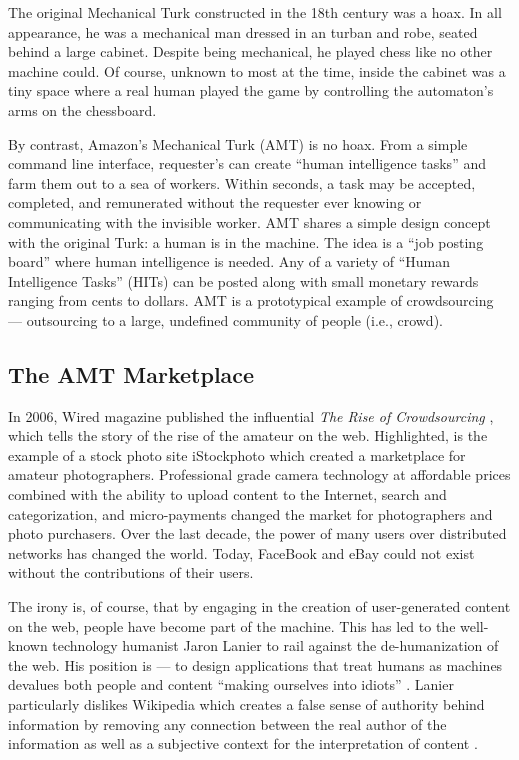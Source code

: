 The original Mechanical Turk constructed in the 18th century was a hoax. In all appearance, he was a mechanical man dressed in an turban and robe, seated behind a large cabinet. Despite being mechanical, he played chess like no other machine could. Of course, unknown to most at the time, inside the cabinet was a tiny space where a real human played the game by controlling the automaton's arms on the chessboard. 

By contrast, Amazon's Mechanical Turk (AMT) is no hoax. From a simple command line interface, requester's can create ``human intelligence tasks'' and farm them out to a sea of workers. Within seconds, a task may be accepted, completed, and remunerated without the requester ever knowing or communicating with the invisible worker. AMT shares a simple design concept with the original Turk: a human is in the machine. The idea is a ``job posting board'' where human intelligence is needed. Any of a variety of ``Human Intelligence Tasks'' (HITs) can be posted along with small monetary rewards ranging from cents to dollars. AMT is a prototypical example of crowdsourcing --- outsourcing to a large, undefined community of people (i.e., crowd).

\subsection{The AMT Marketplace}
\label{theamtmarketplace}

In 2006, Wired magazine published the influential \emph{The Rise of Crowdsourcing}  \citep{Howe:2006uj},  which tells the story of the rise of the amateur on the web. Highlighted, is the example of a stock photo site iStockphoto which created a marketplace for amateur photographers. Professional grade camera technology at affordable prices combined with the ability to upload content to the Internet, search and categorization, and micro-payments changed the market for photographers and photo purchasers. Over the last decade, the power of many users over distributed networks has changed the world. Today, FaceBook and eBay could not exist without the contributions of their users.

The irony is, of course, that by engaging in the creation of user-generated content on the web, people have become part of the machine. This has led to the well-known technology humanist Jaron Lanier to rail against the de-humanization of the web. His position is --- to design applications that treat humans as machines devalues both people and content ``making ourselves into idiots''  \citep{Lanier:2006wb}.  Lanier particularly dislikes Wikipedia which creates a false sense of authority behind information by removing any connection between the real author of the information as well as a subjective context for the interpretation of content  \citep{Lanier:2010ud}. 

